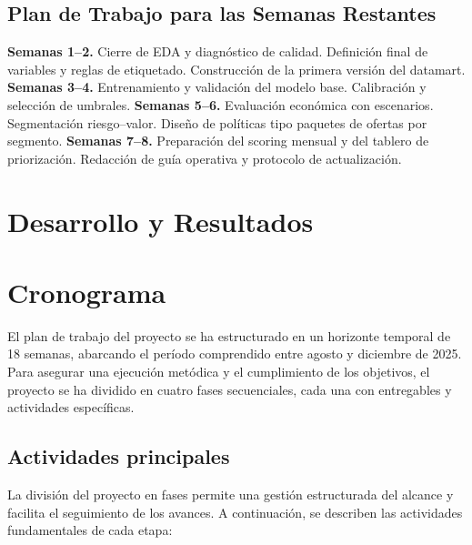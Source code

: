 \subsection{Plan de Trabajo para las Semanas Restantes}
\textbf{Semanas 1–2.} Cierre de EDA y diagnóstico de calidad. Definición final de variables y reglas de etiquetado. Construcción de la primera versión del datamart. \textbf{Semanas 3–4.} Entrenamiento y validación del modelo base. Calibración y selección de umbrales. \textbf{Semanas 5–6.} Evaluación económica con escenarios. Segmentación riesgo–valor. Diseño de políticas tipo paquetes de ofertas por segmento. \textbf{Semanas 7–8.} Preparación del scoring mensual y del tablero de priorización. Redacción de guía operativa y protocolo de actualización.


\section{Desarrollo y Resultados}












\section{Cronograma}
El plan de trabajo del proyecto se ha estructurado en un horizonte temporal de 18 semanas, abarcando el período comprendido entre agosto y diciembre de 2025. Para asegurar una ejecución metódica y el cumplimiento de los objetivos, el proyecto se ha dividido en cuatro fases secuenciales, cada una con entregables y actividades específicas.

\subsection{Actividades principales} %
La división del proyecto en fases permite una gestión estructurada del alcance y facilita el seguimiento de los avances. A continuación, se describen las actividades fundamentales de cada etapa:

